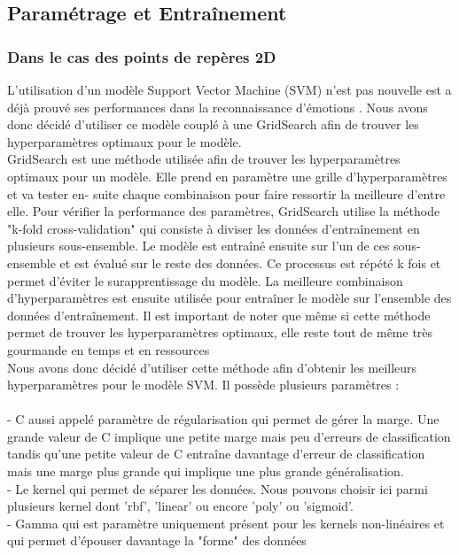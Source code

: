 \documentclass{rapport}
\begin{document}
\subsection{Paramétrage et Entraînement}

\subsubsection{Dans le cas des points de repères 2D}
L'utilisation d'un modèle Support Vector Machine (SVM) n'est pas nouvelle est a déjà prouvé ses performances dans la reconnaissance
d'émotions \cite{kalapalaFacialExpressionRecognition2020}. Nous avons donc décidé d'utiliser ce modèle couplé à une GridSearch
afin de trouver les hyperparamètres optimaux pour le modèle.\\

GridSearch est une méthode utilisée afin de trouver les hyperparamètres optimaux
pour un modèle. Elle prend en paramètre une grille d'hyperparamètres et va tester en-
suite chaque combinaison pour faire ressortir la meilleure d'entre elle. Pour vérifier la
performance des paramètres, GridSearch utilise la méthode "k-fold cross-validation" qui
consiste à diviser les données d'entraînement en plusieurs sous-ensemble. Le modèle est
entraîné ensuite sur l'un de ces sous-ensemble et est évalué sur le reste des données. Ce
processus est répété k fois et permet d'éviter le surapprentissage du modèle. La meilleure
combinaison d'hyperparamètres est ensuite utilisée pour entraîner le modèle sur l'ensemble
des données d'entraînement. Il est important de noter que même si cette méthode permet
de trouver les hyperparamètres optimaux, elle reste tout de même très gourmande en
temps et en ressources\\

Nous avons donc décidé d'utiliser cette méthode afin d'obtenir les meilleurs hyperparamètres pour le modèle SVM. Il possède plusieurs paramètres :\\
\\- C aussi appelé paramètre de régularisation qui permet de gérer la marge. Une grande valeur de C implique une petite marge mais peu d'erreurs de classification
tandis qu'une petite valeur de C entraîne davantage d'erreur de classification mais une marge plus grande qui implique une plus grande généralisation.\\
- Le kernel qui permet de séparer les données. Nous pouvons choisir ici parmi plusieurs kernel dont 'rbf', 'linear' ou encore
'poly' ou 'sigmoid'.\\
- Gamma qui est paramètre uniquement présent pour les kernels non-linéaires et qui permet d'épouser davantage la "forme" des données
\end{document}
